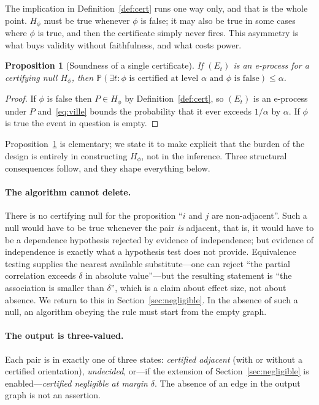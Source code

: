 \documentclass[pdflatex,sn-apa]{sn-jnl}
\theoremstyle{thmstyleone}%
\newtheorem{proposition}[theorem]{Proposition}%
\theoremstyle{thmstyletwo}%
\theoremstyle{thmstylethree}%
\newcommand{\Prob}{\mathbb{P}}
\begin{document}
The implication in Definition~\ref{def:cert} runs one way only, and that is
the whole point. $H_\phi$ must be true whenever $\phi$ is false; it may also
be true in some cases where $\phi$ is true, and then the certificate simply
never fires. This asymmetry is what buys validity without faithfulness, and
what costs power.

\begin{proposition}[Soundness of a single certificate]\label{prop:single}
If $(E_t)$ is an e-process for a certifying null $H_\phi$, then
$\Prob(\exists t: \text{$\phi$ is certified at level $\alpha$ and $\phi$ is
false}) \le \alpha$.
\end{proposition}

\begin{proof}
If $\phi$ is false then $P \in H_\phi$ by Definition~\ref{def:cert}, so
$(E_t)$ is an e-process under $P$ and~\eqref{eq:ville} bounds the probability
that it ever exceeds $1/\alpha$ by $\alpha$. If $\phi$ is true the event in
question is empty.
\end{proof}

Proposition~\ref{prop:single} is elementary; we state it to make explicit that
the burden of the design is entirely in constructing $H_\phi$, not in the
inference. Three structural consequences follow, and they shape everything
below.

\paragraph{The algorithm cannot delete.} There is no certifying null for the
proposition ``$i$ and $j$ are non-adjacent''. Such a null would have to be
true whenever the pair \emph{is} adjacent, that is, it would have to be a
dependence hypothesis rejected by evidence of independence; but evidence of
independence is exactly what a hypothesis test does not provide. Equivalence
testing supplies the nearest available substitute---one can reject ``the
partial correlation exceeds $\delta$ in absolute value''---but the resulting
statement is ``the association is smaller than $\delta$'', which is a claim
about effect size, not about absence. We return to this in
Section~\ref{sec:negligible}. In the absence of such a null, an algorithm
obeying the rule must start from the empty graph.

\paragraph{The output is three-valued.} Each pair is in exactly one of three
states: \emph{certified adjacent} (with or without a certified orientation),
\emph{undecided}, or---if the extension of Section~\ref{sec:negligible} is
enabled---\emph{certified negligible at margin $\delta$}. The absence of an
edge in the output graph is not an assertion.
\end{document}

